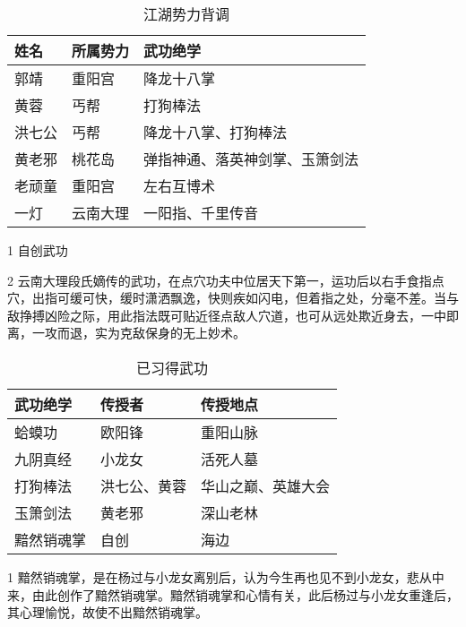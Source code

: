 \documentclass[print, doctor, vlined]{DissertUESTC}
\begin{document}
	\begin{table}[!ht]
		\caption{江湖势力背调} \label{tab: 江湖势力背调}
		\begin{threeparttable}
			\begin{tabular}{p{2cm} p{3cm} p{7cm}}
				\toprule
				\textbf{姓名} & \textbf{所属势力} & \textbf{武功绝学} \\
				\midrule
				郭靖 & 重阳宫 & 降龙十八掌 \\
				黄蓉 & 丐帮 & 打狗棒法 \\
				洪七公 & 丐帮 & 降龙十八掌、打狗棒法 \\
				黄老邪 & 桃花岛 & 弹指神通、落英神剑掌、玉箫剑法 \\
				老顽童 & 重阳宫 & 左右互博术\tnote{1} \\
				一灯 & 云南大理 & 一阳指\tnote{2}、千里传音 \\
				\bottomrule
			\end{tabular}
			\begin{tablenotes}
				\item[1] 自创武功
				\item[2] 云南大理段氏嫡传的武功，在点穴功夫中位居天下第一，运功后以右手食指点穴，出指可缓可快，缓时潇洒飘逸，快则疾如闪电，但着指之处，分毫不差。当与敌挣搏凶险之际，用此指法既可贴近径点敌人穴道，也可从远处欺近身去，一中即离，一攻而退，实为克敌保身的无上妙术。
			\end{tablenotes}
		\end{threeparttable}
	\end{table}
	
	\begin{table}[!ht]
		\caption{已习得武功} \label{tab: 已习得武功}
		\begin{threeparttable}
			\begin{tabular}{p{3cm} p{3cm} p{5cm}}
				\toprule
				\textbf{武功绝学} & \textbf{传授者} & \textbf{传授地点} \\
				\midrule
				蛤蟆功 & 欧阳锋 & 重阳山脉 \\
				九阴真经 & 小龙女 & 活死人墓 \\
				打狗棒法 & 洪七公、黄蓉 & 华山之巅、英雄大会 \\
				玉箫剑法 & 黄老邪 & 深山老林 \\
				黯然销魂掌\tnote{1} & 自创 & 海边 \\
				\bottomrule
			\end{tabular}
			\begin{tablenotes}[online]
				\item[1] 黯然销魂掌，是在杨过与小龙女离别后，认为今生再也见不到小龙女，悲从中来，由此创作了黯然销魂掌。黯然销魂掌和心情有关，此后杨过与小龙女重逢后，其心理愉悦，故使不出黯然销魂掌。
			\end{tablenotes}
		\end{threeparttable}
	\end{table}
	
\end{document}
